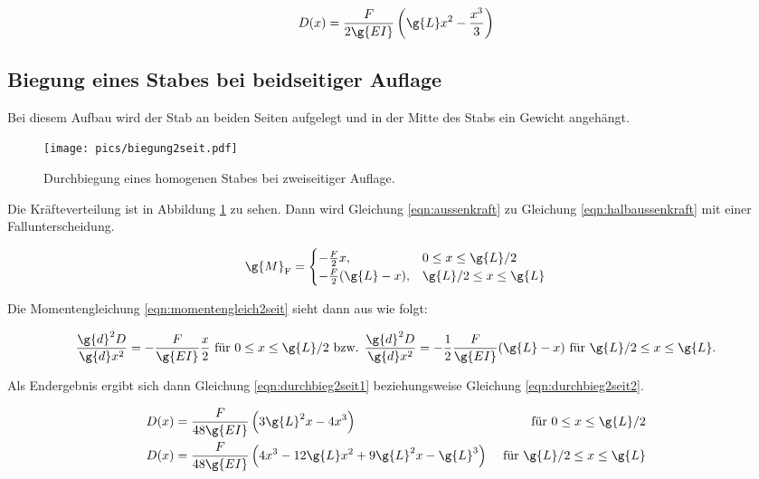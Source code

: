 \begin{equation}
  D(x) = \frac{F}{2 \g{E I}} \left( \g{L}x^2 - \frac{x^3}{3} \right)
  \label{eqn:durchbiegeinseit}
\end{equation}

\subsection{Biegung eines Stabes bei beidseitiger Auflage}

Bei diesem Aufbau wird der Stab an beiden Seiten aufgelegt und in der
Mitte des Stabs ein Gewicht angehängt.

\begin{figure}[h]
  \centering
  \texttt{[image: pics/biegung2seit.pdf]}
  \caption{Durchbiegung eines homogenen Stabes bei zweiseitiger Auflage\cite{anleitung}.}
  \label{fig:biegung2seit}
\end{figure}

Die Kräfteverteilung ist in Abbildung \ref{fig:biegung2seit} zu sehen.
Dann wird Gleichung \eqref{eqn:aussenkraft} zu Gleichung
\eqref{eqn:halbaussenkraft} mit einer Fallunterscheidung.

\begin{equation}\label{eqn:halbaussenkraft}
  \g{M}_{\text{F}} =
  \begin{cases}
     -\frac{F}{2} x, & 0 \leq x \leq \g{L}/2\\
     -\frac{F}{2} (\g{L} - x), & \g{L}/2 \leq x \leq \g{L}
  \end{cases}
\end{equation}

Die Momentengleichung \eqref{eqn:momentengleich2seit} sieht dann aus
wie folgt:

\begin{equation}
  \frac{\g{d}^2 D}{\g{d}x^2} = -\frac{F}{\g{E I}}\frac{x}{2} \text{ für }
  0 \leq x \leq \g{L}/2 \text{ bzw. } \frac{\g{d}^2 D}{\g{d}x^2} = -
  \frac{1}{2}\frac{F}{\g{E I}}(\g{L} - x) \text{ für } \g{L}/2 \leq x \leq \g{L}.
  \label{eqn:momentengleich2seit}
\end{equation}

Als Endergebnis ergibt sich dann Gleichung \eqref{eqn:durchbieg2seit1}
beziehungsweise Gleichung \eqref{eqn:durchbieg2seit2}.

\begin{align}
  D(x) &= \frac{F}{48\g{E I}} \left( 3\g{L}^2 x - 4 x^3 \right)
  &\text{ für } 0 \leq x \leq \g{L}/2
  \label{eqn:durchbieg2seit1}\\
  D(x) &= \frac{F}{48\g{E I}} \left( 4 x^3 - 12 \g{L}x^2 + 9\g{L}^2 x - \g{L}^3 \right)
  &\text{ für } \g{L}/2 \leq x \leq \g{L}
  \label{eqn:durchbieg2seit2}
\end{align}
